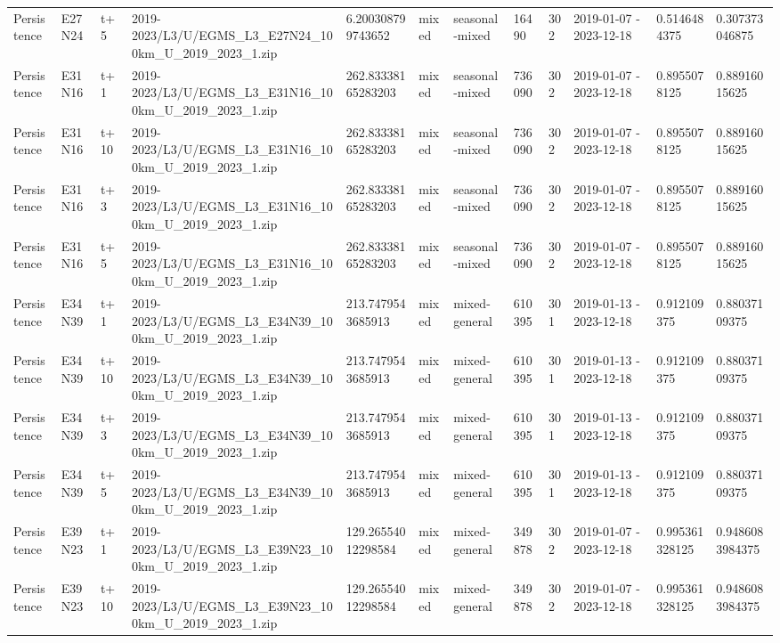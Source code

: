 \begin{landscape}
\begin{longtable}{llllllllllll}
Persistence & E27N24 & t+5 & 2019-2023/L3/U/EGMS\_L3\_E27N24\_100km\_U\_2019\_2023\_1.zip & 6.200308799743652 & mixed & seasonal-mixed & 16490 & 302 & 2019-01-07 - 2023-12-18 & 0.5146484375 & 0.307373046875 \\
Persistence & E31N16 & t+1 & 2019-2023/L3/U/EGMS\_L3\_E31N16\_100km\_U\_2019\_2023\_1.zip & 262.83338165283203 & mixed & seasonal-mixed & 736090 & 302 & 2019-01-07 - 2023-12-18 & 0.8955078125 & 0.88916015625 \\
Persistence & E31N16 & t+10 & 2019-2023/L3/U/EGMS\_L3\_E31N16\_100km\_U\_2019\_2023\_1.zip & 262.83338165283203 & mixed & seasonal-mixed & 736090 & 302 & 2019-01-07 - 2023-12-18 & 0.8955078125 & 0.88916015625 \\
Persistence & E31N16 & t+3 & 2019-2023/L3/U/EGMS\_L3\_E31N16\_100km\_U\_2019\_2023\_1.zip & 262.83338165283203 & mixed & seasonal-mixed & 736090 & 302 & 2019-01-07 - 2023-12-18 & 0.8955078125 & 0.88916015625 \\
Persistence & E31N16 & t+5 & 2019-2023/L3/U/EGMS\_L3\_E31N16\_100km\_U\_2019\_2023\_1.zip & 262.83338165283203 & mixed & seasonal-mixed & 736090 & 302 & 2019-01-07 - 2023-12-18 & 0.8955078125 & 0.88916015625 \\
Persistence & E34N39 & t+1 & 2019-2023/L3/U/EGMS\_L3\_E34N39\_100km\_U\_2019\_2023\_1.zip & 213.7479543685913 & mixed & mixed-general & 610395 & 301 & 2019-01-13 - 2023-12-18 & 0.912109375 & 0.88037109375 \\
Persistence & E34N39 & t+10 & 2019-2023/L3/U/EGMS\_L3\_E34N39\_100km\_U\_2019\_2023\_1.zip & 213.7479543685913 & mixed & mixed-general & 610395 & 301 & 2019-01-13 - 2023-12-18 & 0.912109375 & 0.88037109375 \\
Persistence & E34N39 & t+3 & 2019-2023/L3/U/EGMS\_L3\_E34N39\_100km\_U\_2019\_2023\_1.zip & 213.7479543685913 & mixed & mixed-general & 610395 & 301 & 2019-01-13 - 2023-12-18 & 0.912109375 & 0.88037109375 \\
Persistence & E34N39 & t+5 & 2019-2023/L3/U/EGMS\_L3\_E34N39\_100km\_U\_2019\_2023\_1.zip & 213.7479543685913 & mixed & mixed-general & 610395 & 301 & 2019-01-13 - 2023-12-18 & 0.912109375 & 0.88037109375 \\
Persistence & E39N23 & t+1 & 2019-2023/L3/U/EGMS\_L3\_E39N23\_100km\_U\_2019\_2023\_1.zip & 129.26554012298584 & mixed & mixed-general & 349878 & 302 & 2019-01-07 - 2023-12-18 & 0.995361328125 & 0.9486083984375 \\
Persistence & E39N23 & t+10 & 2019-2023/L3/U/EGMS\_L3\_E39N23\_100km\_U\_2019\_2023\_1.zip & 129.26554012298584 & mixed & mixed-general & 349878 & 302 & 2019-01-07 - 2023-12-18 & 0.995361328125 & 0.9486083984375 \\

\end{longtable}
\end{landscape}
